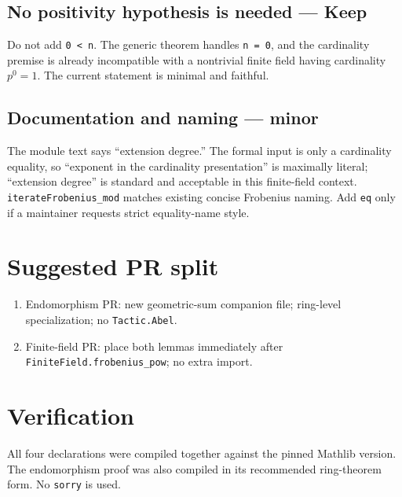 \documentclass[10pt]{article}
\newcommand{\keep}{\textbf{Keep}}
\begin{document}
\subsection*{No positivity hypothesis is needed --- \keep}
Do not add \texttt{0 < n}. The generic theorem handles \texttt{n = 0}, and the cardinality premise is
already incompatible with a nontrivial finite field having cardinality $p^0=1$. The current statement
is minimal and faithful.

\subsection*{Documentation and naming --- minor}
The module text says ``extension degree.'' The formal input is only a cardinality equality, so
``exponent in the cardinality presentation'' is maximally literal; ``extension degree'' is standard
and acceptable in this finite-field context. \texttt{iterateFrobenius\_mod} matches existing concise
Frobenius naming. Add \texttt{eq} only if a maintainer requests strict equality-name style.

\begin{center}
\end{center}

\section*{Suggested PR split}
\begin{enumerate}
\item Endomorphism PR: new geometric-sum companion file; ring-level specialization; no
\texttt{Tactic.Abel}.
\item Finite-field PR: place both lemmas immediately after \texttt{FiniteField.frobenius\_pow}; no
extra import.
\end{enumerate}

\section*{Verification}
All four declarations were compiled together against the pinned Mathlib version. The endomorphism
proof was also compiled in its recommended ring-theorem form. No \texttt{sorry} is used.
\end{document}
